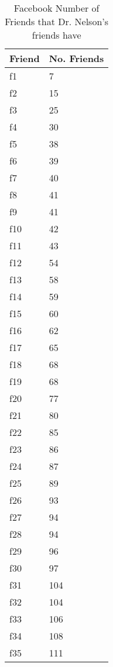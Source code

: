 \begin{table}[!htbp]
	\caption{Facebook Number of Friends that Dr. Nelson's friends have} \label{tab:table1}
	\small
	\begin{center}
	\vspace{-5mm}
	\begin{minipage}{0.22\textwidth}
		\begin{tabular}{|l | l|}
			\hline
			\multicolumn{1}{|c|}{Friend} & \multicolumn{1}{c|}{No. Friends}\\
			\hline
			f1 & 7\\
			f2 & 15\\
			f3 & 25\\
			f4 & 30\\
			f5 & 38\\
			f6 & 39\\
			f7 & 40\\
			f8 & 41\\
			f9 & 41\\
			f10 & 42\\
			f11 & 43\\
			f12 & 54\\
			f13 & 58\\
			f14 & 59\\
			f15 & 60\\
			f16 & 62\\
			f17 & 65\\
			f18 & 68\\
			f19 & 68\\
			f20 & 77\\
			f21 & 80\\
			f22 & 85\\
			f23 & 86\\
			f24 & 87\\
			f25 & 89\\
			f26 & 93\\
			f27 & 94\\
			f28 & 94\\
			f29 & 96\\
			f30 & 97\\
			f31 & 104\\
			f32 & 104\\
			f33 & 106\\
			f34 & 108\\
			f35 & 111\\

\end{tabular}
\end{minipage}
\end{center}
\end{table}
